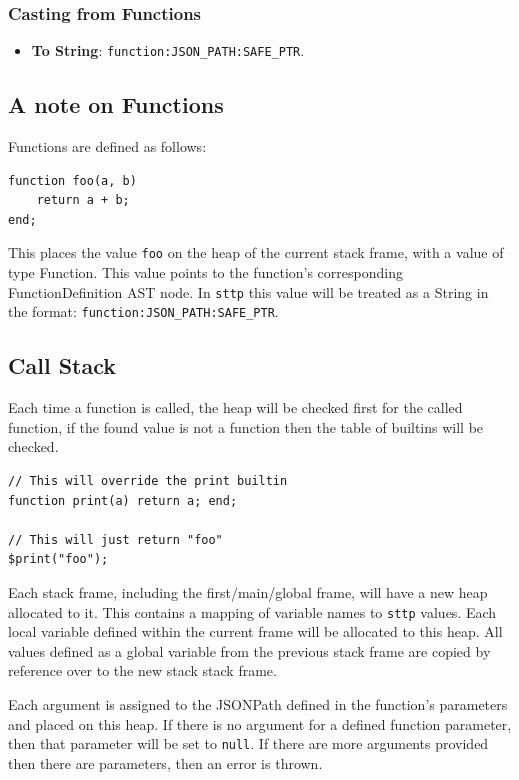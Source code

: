 \documentclass[]{full}
\theoremstyle{definition}
\begin{document}
\subsubsection{Casting from Functions}

\begin{itemize}
    \item \textbf{To String}: \verb|function:JSON_PATH:SAFE_PTR|.
\end{itemize}

\subsection{A note on Functions}

Functions are defined as follows:

\begin{verbatim}
function foo(a, b)
    return a + b;
end;
\end{verbatim}

This places the value \verb|foo| on the heap of the current stack frame, with a value of type Function. This value points to the function's corresponding FunctionDefinition AST node. In \verb|sttp| this value will be treated as a String in the format: \verb|function:JSON_PATH:SAFE_PTR|.

\subsection{Call Stack}
\label{sec:function-call-stack}

Each time a function is called, the heap will be checked first for the called function, if the found value is not a function then the table of builtins will be checked.

\begin{verbatim}
// This will override the print builtin
function print(a) return a; end;

// This will just return "foo"
$print("foo");
\end{verbatim}

Each stack frame, including the first/main/global frame, will have a new heap allocated to it. This contains a mapping of variable names to \verb|sttp| values. Each local variable defined within the current frame will be allocated to this heap. All values defined as a global variable from the previous stack frame are copied by reference over to the new stack stack frame.

Each argument is assigned to the JSONPath defined in the function's parameters and placed on this heap. If there is no argument for a defined function parameter, then that parameter will be set to \verb|null|. If there are more arguments provided then there are parameters, then an error is thrown.
\end{document}
